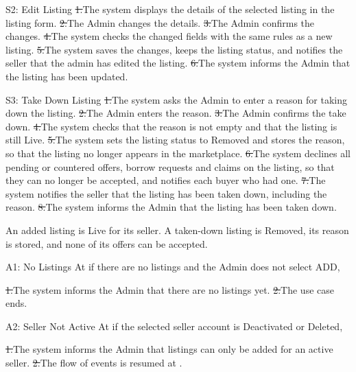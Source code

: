 \begin{flowblock}{S2: Edit Listing}
\st{1.}{The system displays the details of the selected listing in the listing form.}
\st{2.}{The Admin changes the details.}
\st{3.}{The Admin confirms the changes.}
\st{4.}{The system checks the changed fields with the same rules as a new listing.}
\st{5.}{The system saves the changes, keeps the listing status, and notifies the seller that the admin has edited the listing.}
\st{6.}{The system informs the Admin that the listing has been updated.}
\end{flowblock}
\begin{flowblock}{S3: Take Down Listing}
\st{1.}{The system asks the Admin to enter a reason for taking down the listing.}
\st{2.}{The Admin enters the reason.}
\st{3.}{The Admin confirms the take down.}
\st{4.}{The system checks that the reason is not empty and that the listing is still Live.}
\st{5.}{The system sets the listing status to Removed and stores the reason, so that the listing no longer appears in the marketplace.}
\st{6.}{The system declines all pending or countered offers, borrow requests and claims on the listing, so that they can no longer be accepted, and notifies each buyer who had one.}
\st{7.}{The system notifies the seller that the listing has been taken down, including the reason.}
\st{8.}{The system informs the Admin that the listing has been taken down.}
\end{flowblock}
An added listing is Live for its seller. A taken-down listing is Removed, its reason is stored, and none of its offers can be accepted.\par
{}
\begin{flowblock}{A1: No Listings}
At  if there are no listings and the Admin does not select ADD,\par
\st{1.}{The system informs the Admin that there are no listings yet.}
\st{2.}{The use case ends.}
\end{flowblock}
\begin{flowblock}{A2: Seller Not Active}
At  if the selected seller account is Deactivated or Deleted,\par
\st{1.}{The system informs the Admin that listings can only be added for an active seller.}
\st{2.}{The flow of events is resumed at .}
\end{flowblock}
